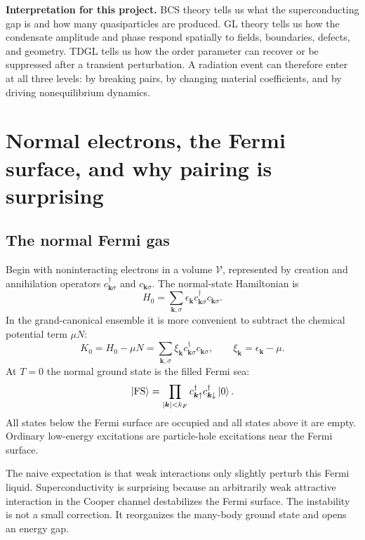 \documentclass[11pt]{article}
\numberwithin{equation}{section}
\newcommand{\kvec}{\bm{k}}
\begin{document}
\begin{physicsbox}
\textbf{Interpretation for this project.} BCS theory tells us what the superconducting gap is and how many quasiparticles are produced. GL theory tells us how the condensate amplitude and phase respond spatially to fields, boundaries, defects, and geometry. TDGL tells us how the order parameter can recover or be suppressed after a transient perturbation. A radiation event can therefore enter at all three levels: by breaking pairs, by changing material coefficients, and by driving nonequilibrium dynamics.
\end{physicsbox}

\section{Normal electrons, the Fermi surface, and why pairing is surprising}

\subsection{The normal Fermi gas}

Begin with noninteracting electrons in a volume $\mathcal{V}$, represented by creation and annihilation operators $c_{\kvec\sigma}^{\dagger}$ and $c_{\kvec\sigma}$. The normal-state Hamiltonian is
\begin{equation}
H_0=\sum_{\kvec,\sigma}\epsilon_{\kvec} c_{\kvec\sigma}^{\dagger}c_{\kvec\sigma}.
\end{equation}
In the grand-canonical ensemble it is more convenient to subtract the chemical potential term $\mu N$:
\begin{equation}
K_0=H_0-\mu N=\sum_{\kvec,\sigma}\xi_{\kvec} c_{\kvec\sigma}^{\dagger}c_{\kvec\sigma},
\qquad
\xi_{\kvec}=\epsilon_{\kvec}-\mu.
\end{equation}
At $T=0$ the normal ground state is the filled Fermi sea:
\begin{equation}
\ket{\mathrm{FS}}=\prod_{|\kvec|<k_F} c_{\kvec\uparrow}^{\dagger}c_{\kvec\downarrow}^{\dagger}\ket{0}.
\end{equation}
All states below the Fermi surface are occupied and all states above it are empty. Ordinary low-energy excitations are particle-hole excitations near the Fermi surface.

The naive expectation is that weak interactions only slightly perturb this Fermi liquid. Superconductivity is surprising because an arbitrarily weak attractive interaction in the Cooper channel destabilizes the Fermi surface. The instability is not a small correction. It reorganizes the many-body ground state and opens an energy gap.
\end{document}
